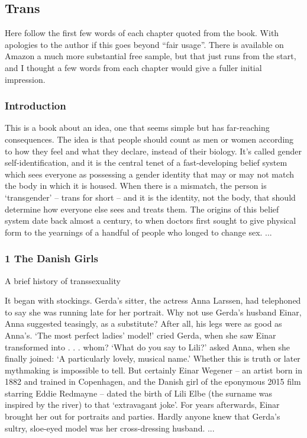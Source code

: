 \documentclass[10pt,titlepage]{book}
\begin{document}
\subsection{Trans \cite{joyce2021}}
Here follow the first few words of each chapter quoted from the book.
With apologies to the author if this goes beyond ``fair usage''.
There is available on Amazon a much more substantial free sample, but that just runs from the start, and I thought a few words from each chapter would give a fuller initial impression.

\subsubsection{Introduction}

This is a book about an idea, one that seems simple but has far-reaching consequences. The idea is that people should count as men or women according to how they feel and what they declare, instead of their biology. It’s called gender self-identification, and it is the central tenet of a fast-developing belief system which sees everyone as possessing a gender identity that may or may not match the body in which it is housed. When there is a mismatch, the person is ‘transgender’ – trans for short – and it is the identity, not the body, that should determine how everyone else sees and treats them. The origins of this belief system date back almost a century, to when doctors first sought to give physical form to the yearnings of a handful of people who longed to change sex.
...

\subsubsection{1 The Danish Girls}

A brief history of transsexuality

It began with stockings. Gerda’s sitter, the actress Anna Larssen, had telephoned to say she was running late for her portrait. Why not use Gerda’s husband Einar, Anna suggested teasingly, as a substitute? After all, his legs were as good as Anna’s. ‘The most perfect ladies’ model!’ cried Gerda, when she saw Einar transformed into . . . whom? ‘What do you say to Lili?’ asked Anna, when she finally joined: ‘A particularly lovely, musical name.’ Whether this is truth or later mythmaking is impossible to tell. But certainly Einar Wegener – an artist born in 1882 and trained in Copenhagen, and the Danish girl of the eponymous 2015 film starring Eddie Redmayne – dated the birth of Lili Elbe (the surname was inspired by the river) to that ‘extravagant joke’. For years afterwards, Einar brought her out for portraits and parties. Hardly anyone knew that Gerda’s sultry, sloe-eyed model was her cross-dressing husband.
...
\end{document}
